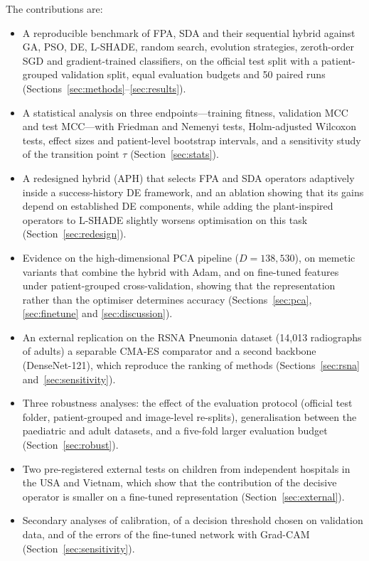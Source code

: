 \documentclass[preprint,12pt]{elsarticle}
\begin{document}
The contributions are:
\begin{itemize}
\item A reproducible benchmark of FPA, SDA and their sequential hybrid against GA, PSO, DE, L-SHADE, random search, evolution strategies, zeroth-order SGD and gradient-trained classifiers, on the official test split with a patient-grouped validation split, equal evaluation budgets and 50 paired runs (Sections~\ref{sec:methods}--\ref{sec:results}).
\item A statistical analysis on three endpoints---training fitness, validation MCC and test MCC---with Friedman and Nemenyi tests, Holm-adjusted Wilcoxon tests, effect sizes and patient-level bootstrap intervals, and a sensitivity study of the transition point $\tau$ (Section~\ref{sec:stats}).
\item A redesigned hybrid (APH) that selects FPA and SDA operators adaptively inside a success-history DE framework, and an ablation showing that its gains depend on established DE components, while adding the plant-inspired operators to L-SHADE slightly worsens optimisation on this task (Section~\ref{sec:redesign}).
\item Evidence on the high-dimensional PCA pipeline ($D=138{,}530$), on memetic variants that combine the hybrid with Adam, and on fine-tuned features under patient-grouped cross-validation, showing that the representation rather than the optimiser determines accuracy (Sections~\ref{sec:pca}, \ref{sec:finetune} and \ref{sec:discussion}).
\item An external replication on the RSNA Pneumonia dataset (14,013 radiographs of adults) a separable CMA-ES comparator and a second backbone (DenseNet-121), which reproduce the ranking of methods (Sections~\ref{sec:rsna} and~\ref{sec:sensitivity}).
\item Three robustness analyses: the effect of the evaluation protocol (official test folder, patient-grouped and image-level re-splits), generalisation between the paediatric and adult datasets, and a five-fold larger evaluation budget (Section~\ref{sec:robust}).
\item Two pre-registered external tests on children from independent hospitals in the USA and Vietnam, which show that the contribution of the decisive operator is smaller on a fine-tuned representation (Section~\ref{sec:external}).
\item Secondary analyses of calibration, of a decision threshold chosen on validation data, and of the errors of the fine-tuned network with Grad-CAM (Section~\ref{sec:sensitivity}).
\end{itemize}
\end{document}
